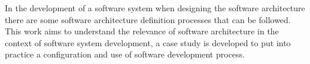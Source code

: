 In the development of a software system when designing the software architecture there are some software architecture definition processes that can be followed. This work aims to understand the relevance of software architecture in the context of software system development, a case study is developed to put into practice
a configuration and use of software development process.